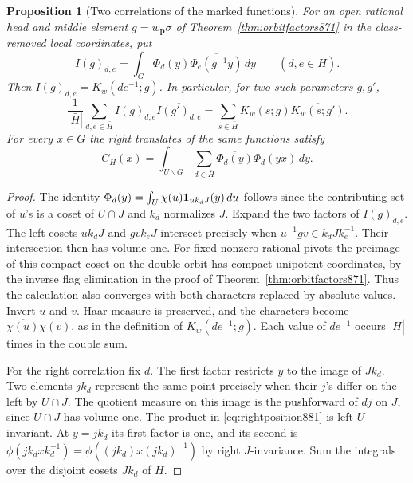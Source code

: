 \documentclass[a4paper,11pt]{article}
\newtheorem{proposition}{Proposition}[section]
\theoremstyle{definition}
\theoremstyle{remark}
\numberwithin{equation}{section}
\begin{document}
\begin{proposition}[Two correlations of the marked functions]
\leavevmode\label{prop:twocorrelations881}
For an open rational head and middle element \(g=w_{\mathbf p}\sigma\)
of Theorem~\ref{thm:orbitfactors871} in the class-removed local
coordinates, put
\[
 I(g)_{d,e}=\int_G \Phi_d(y)\overline{\Phi_e(g^{-1}y)}\,dy
        \qquad(d,e\in\bar H).
\]
Then \(I(g)_{d,e}=K_w(de^{-1};g)\). In particular, for two
such parameters \(g,g'\),
\[
 \frac{1}{|\bar H|}\sum_{d,e\in\bar H}
 I(g)_{d,e}\overline{I(g')_{d,e}}
   =\sum_{s\in\bar H}K_w(s;g)\overline{K_w(s;g')}.
\]
For every \(x\in G\) the right translates of the same functions
satisfy
\begin{equation}
 C_H(x)=\int_{U\backslash G}\sum_{d\in\bar H}
                \overline{\Phi_d(y)}\Phi_d(yx)\,d\dot y .
 \label{eq:rightposition881}
\end{equation}
\end{proposition}
\begin{proof}
The identity
\(\Phi_d(y)=\int_U\chi(u){\bf1}_{u k_dJ}(y)\,du\)
follows since the contributing set of \(u\)'s is a coset of
\(U\cap J\) and \(k_d\) normalizes \(J\). Expand the two factors
of \(I(g)_{d,e}\). The left cosets \(u k_dJ\) and
\(g v k_eJ\) intersect precisely when
\(u^{-1}g v\in k_d J k_e^{-1}\). Their intersection then has
volume one. For fixed nonzero rational pivots the preimage of
this compact coset on the double orbit has compact unipotent
coordinates, by the inverse flag elimination in the proof of
Theorem~\ref{thm:orbitfactors871}. Thus the calculation also
converges with both characters replaced by absolute values.
Invert \(u\) and \(v\). Haar measure is preserved, and the
characters become \(\overline{\chi(u)}\chi(v)\), as in the
definition of \(K_w(de^{-1};g)\). Each value of \(de^{-1}\)
occurs \(|\bar H|\) times in the double sum.

For the right correlation fix \(d\). The first factor restricts
\(\dot y\) to the image of \(J k_d\). Two elements \(j k_d\)
represent the same point precisely when their \(j\)'s differ on
the left by \(U\cap J\). The quotient measure on this image is
the pushforward of \(dj\) on \(J\), since \(U\cap J\) has
volume one. The product in \eqref{eq:rightposition881} is left
\(U\)-invariant. At \(y=j k_d\) its first factor is one, and its
second is \(\phi(j k_d x k_d^{-1})=\phi((j k_d)x(j k_d)^{-1})\)
by right \(J\)-invariance. Sum the integrals over the disjoint
cosets \(J k_d\) of \(H\).
\end{proof}
\end{document}
